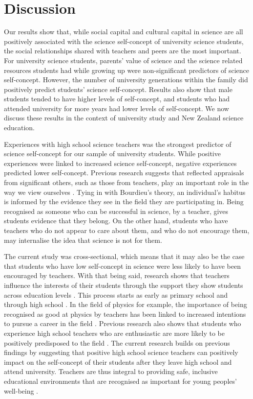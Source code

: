 \section{Discussion}
\label{discussion}
Our results show that, while social capital and cultural capital in science are all positively associated with the science self-concept of university science students, the social relationships shared with teachers and peers are the most important. For university science students, parents' value of science and the science related resources students had while growing up were non-significant predictors of science self-concept. However, the number of university generations within the family did positively predict students' science self-concept. Results also show that male students tended to have higher levels of self-concept, and students who had attended university for more years had lower levels of self-concept. We now discuss these results in the context of university study and New Zealand science education.

Experiences with high school science teachers was the strongest predictor of science self-concept for our sample of university students. While positive experiences were linked to increased science self-concept, negative experiences predicted lower self-concept. Previous research suggests that reflected appraisals from significant others, such as those from teachers, play an important role in the way we view ourselves \citep{bong2003academic}. Tying in with Bourdieu's theory, an individual's habitus is informed by the evidence they see in the field they are participating in. Being recognised as someone who can be successful in science, by a teacher, gives students evidence that they belong. On the other hand, students who have teachers who do not appear to care about them, and who do not encourage them, may internalise the idea that science is not for them. 

The current study was cross-sectional, which means that it may also be the case that students who have low self-concept in science were less likely to have been encouraged by teachers. With that being said, research shows that teachers influence the interests of their students through the support they show students across education levels \citep{marjoribanks2006adolescents}. This process starts as early as primary school \citep{fauth2014student} and through high school \citep{marjoribanks2006adolescents,Hazari2017}. In the field of physics for example, the importance of being recognised as good at physics by teachers has been linked to increased intentions to pursue a career in the field \citep{Hazari2017}. Previous research also shows that students who experience high school teachers who are enthusiastic are more likely to be positively predisposed to the field \citep{keller2017impact}. The current research builds on previous findings by suggesting that positive high school science teachers can positively impact on the self-concept of their students after they leave high school and attend university. Teachers are thus integral to providing safe, inclusive educational environments that are recognised as important for young peoples' well-being \citep{wellbeing2019}. 

